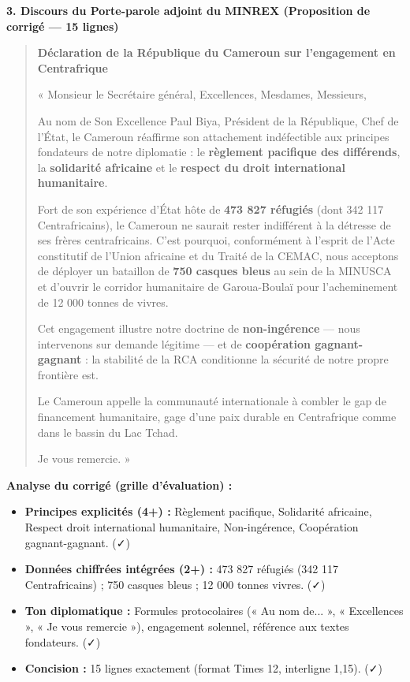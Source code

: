 \documentclass[11pt]{article}
\begin{document}
\begin{exoresolu}
\textbf{3. Discours du Porte-parole adjoint du MINREX (Proposition de corrigé — 15 lignes)}

\begin{quote}
\textbf{Déclaration de la République du Cameroun sur l'engagement en Centrafrique}

« Monsieur le Secrétaire général, Excellences, Mesdames, Messieurs,

Au nom de Son Excellence Paul Biya, Président de la République, Chef de l'État, le Cameroun réaffirme son attachement indéfectible aux principes fondateurs de notre diplomatie : le \textbf{règlement pacifique des différends}, la \textbf{solidarité africaine} et le \textbf{respect du droit international humanitaire}.

Fort de son expérience d'État hôte de \textbf{473 827 réfugiés} (dont 342 117 Centrafricains), le Cameroun ne saurait rester indifférent à la détresse de ses frères centrafricains. C'est pourquoi, conformément à l'esprit de l'Acte constitutif de l'Union africaine et du Traité de la CEMAC, nous acceptons de déployer un bataillon de \textbf{750 casques bleus} au sein de la MINUSCA et d'ouvrir le corridor humanitaire de Garoua-Boulaï pour l'acheminement de 12 000 tonnes de vivres.

Cet engagement illustre notre doctrine de \textbf{non-ingérence} — nous intervenons sur demande légitime — et de \textbf{coopération gagnant-gagnant} : la stabilité de la RCA conditionne la sécurité de notre propre frontière est.

Le Cameroun appelle la communauté internationale à combler le gap de financement humanitaire, gage d'une paix durable en Centrafrique comme dans le bassin du Lac Tchad.

Je vous remercie. »
\end{quote}

\textbf{Analyse du corrigé (grille d'évaluation) :}
\begin{itemize}
    \item \textbf{Principes explicités (4+) :} Règlement pacifique, Solidarité africaine, Respect droit international humanitaire, Non-ingérence, Coopération gagnant-gagnant. (✓)
    \item \textbf{Données chiffrées intégrées (2+) :} 473 827 réfugiés (342 117 Centrafricains) ; 750 casques bleus ; 12 000 tonnes vivres. (✓)
    \item \textbf{Ton diplomatique :} Formules protocolaires (« Au nom de... », « Excellences », « Je vous remercie »), engagement solennel, référence aux textes fondateurs. (✓)
    \item \textbf{Concision :} 15 lignes exactement (format Times 12, interligne 1,15). (✓)
\end{itemize}
\end{exoresolu}
\end{document}
